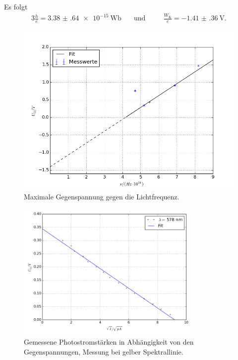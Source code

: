 Es folgt
\begin{alignat}{3}
	\frac{h}{e}=\SI{3.38(64)e-15}{\weber} \quad&\text{und} \quad&&\frac{W_\text{K}}{e}= \SI{-1.41(36)}{\volt}.
\end{alignat}
\begin{figure}[H]
	\centering
	\includegraphics[width=\textwidth]{Bilder/unu_diag.png}
	\caption{Maximale Gegenspannung gegen die Lichtfrequenz. \cite{matplotlib}}
	\label{fig:unu}
\end{figure}
\newpage
\begin{figure}[p]
	\centering
	\includegraphics[width=0.8\textwidth]{Bilder/Fit_gelb.png}
	\caption{Gemessene Photostromstärken in Abhängigkeit von den Gegenspannungen, Messung bei gelber Spektrallinie.\cite{matplotlib}}
	\label{fig:uidiagramm1}
\end{figure}
